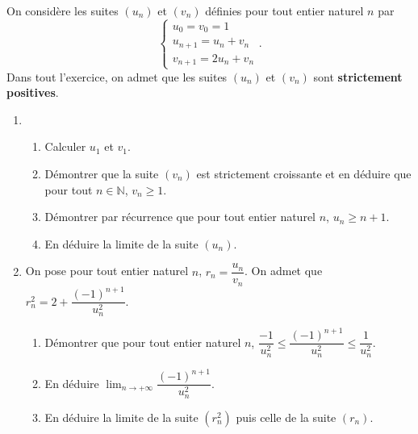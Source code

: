 \documentclass[11pt,fleqn, openany]{book} %
\begin{document}
\begin{exercise}[subtitle={(Métropole 2021)}]

On considère les suites \((u_n)\) et \((v_n)\) définies pour tout entier naturel \(n\) par
\[\left\{\begin{array}{l}u_0 = v_0=1\\u_{n+1}=u_n+v_n\\v_{n+1}=2u_n+v_n\end{array}\right. .\]
Dans tout l'exercice, on admet que les suites \((u_n)\) et \((v_n)\) sont \textbf{strictement positives}.
\begin{enumerate}
 	\item
\begin{enumerate}
 	\item Calculer \(u_1\) et \(v_1\).
 	\item Démontrer que la suite \((v_n)\) est strictement croissante et en déduire que pour tout \(n\in\mathbb{N}\), \(v_n \geqslant 1\).
 	\item Démontrer par récurrence que pour tout entier naturel \(n\), \(u_n \geqslant n+1\).
 	\item En déduire la limite de la suite \((u_n)\).
\end{enumerate}

 	\item On pose pour tout entier naturel \(n\), $r_n = \dfrac{u_n}{v_n}$.
On admet que $r_n^2 = 2 + \dfrac{(-1)^{n+1}}{u_n^2}$.
\begin{enumerate}

 	\item Démontrer que pour tout entier naturel \(n\), $\dfrac{-1}{u_n^2} \leqslant \dfrac{(-1)^{n+1}}{u_n^2} \leqslant \dfrac{1}{u_n^2}$.
 	\item En déduire \(\displaystyle\lim_{n\to+\infty}\dfrac{(-1)^{n+1}}{u_n^2}\).
 	\item En déduire la limite de la suite \((r_n^2)\) puis celle de la suite \((r_n)\).
\end{enumerate}

\end{enumerate}
\newpage
\end{exercise}
\end{document}
